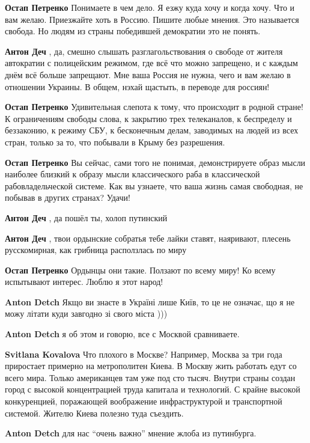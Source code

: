 \begin{itemize}
\begin{itemize}
\textbf{Остап Петренко} Понимаете в чем дело. Я езжу куда хочу и когда хочу. Что и вам желаю. Приезжайте хоть в Россию. Пишите любые мнения.
Это называется свобода.
Но людям из страны победившей демократии это не понять.

\textbf{Антон Деч} , да, смешно слышать разглагольствования о свободе от жителя автократии с полицейским режимом, где всё что можно запрещено, и с каждым днём всё больше запрещают. Мне ваша Россия не нужна, чего и вам желаю в отношении Украины. В общем, нэхай щастыть, в переводе для россиян!

\textbf{Остап Петренко} Удивительная слепота к тому, что происходит в родной стране! К ограничениям свободы слова, к закрытию трех телеканалов, к беспределу и беззаконию, к режиму СБУ, к бесконечным делам, заводимых на людей из всех стран, только за то, что побывали в Крыму без разрешения.

\textbf{Остап Петренко} Вы сейчас, сами того не понимая, демонстрируете образ мысли наиболее близкий к образу мысли классического раба в классической рабовладельческой системе.
Как вы узнаете, что ваша жизнь самая свободная, не побывав в других странах?
Удачи!

\textbf{Антон Деч} , да пошёл ты, холоп путинский

\textbf{Антон Деч} , твои ордынские собратья тебе лайки ставят, наяривают, плесень русскомирная, как грибница расползлась по миру

\textbf{Остап Петренко} Ордынцы они такие. Ползают по всему миру! Ко всему испытывают интерес. Люблю я этот народ!

\textbf{Anton Detch} Якщо ви знаєте в Україні лише Київ, то це не означає, що я не можу літати куди завгодно зі свого міста )))

\textbf{Anton Detch} я об этом и говорю, все с Москвой сравниваете.

\textbf{Svitlana Kovalova} Что плохого в Москве? Например, Москва за три года приростает примерно на метрополитен Киева.
В Москву жить работать едут со всего мира. Только американцев там уже под сто тысяч. Внутри страны создан город с высокой концентрацией труда капитала и технологий. С крайне высокой конкуренцией, поражающей воображение инфраструктурой и транспортной системой.
Жителю Киева полезно туда съездить.

\textbf{Anton Detch} для нас \enquote{очень важно} мнение жлоба из путинбурга.


\end{itemize}
\end{itemize}
